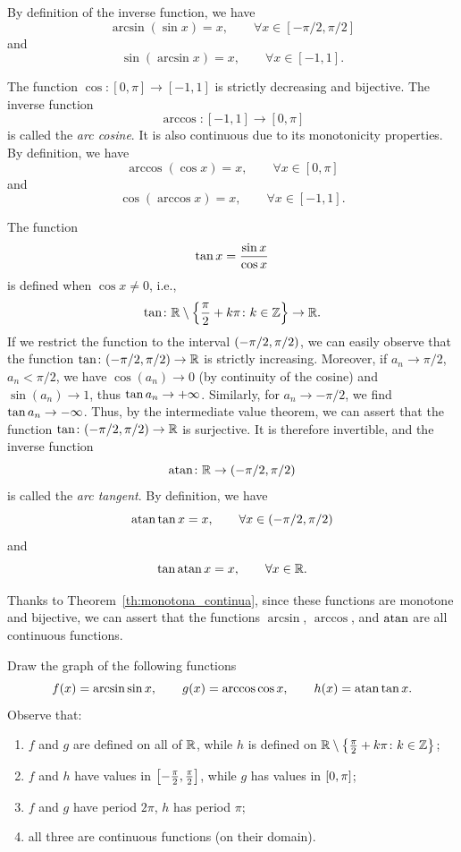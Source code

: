 By definition of the inverse function, we have
\[
  \arcsin(\sin x) = x, \qquad \forall x \in [-\pi/2, \pi/2]
\]
and
\[
  \sin(\arcsin x) = x, \qquad \forall x \in [-1, 1].
\]

The function $\cos \colon[0,\pi] \to [-1,1]$ is strictly decreasing and
bijective. The inverse function
\[
  \arccos\colon[-1,1] \to [0,\pi]
\]
is called the \emph{arc cosine}. It is also continuous due to its monotonicity
properties. By definition, we have
\[
  \arccos(\cos x) = x, \qquad \forall x \in [0,\pi]
\]
and
\[
    \cos(\arccos x) = x, \qquad \forall x \in [-1,1].
\]

The function
%
\[
\operatorname{tan} x = \frac{\sin x}{\cos x}
\]
is defined when $\cos x\neq 0$, i.e.,
\[
  \operatorname{tan} \colon {\mathbb R} \setminus{\left\{ \frac \pi 2+ k\pi\colon k\in {\mathbb Z}\right\}} \to {\mathbb R}.
\]
If we restrict the function to the interval ${\left( -\pi/2, \pi/2 \right)}$, we can
easily observe that the function $\operatorname{tan}\colon(-\pi/2,\pi/2)\to {\mathbb R}$ is strictly
increasing. Moreover, if $a_n \to \pi/2$, $a_n<\pi/2$, we have $\cos(a_n)\to 0$
(by continuity of the cosine) and $\sin(a_n)\to 1$, thus $\operatorname{tan} a_n\to +\infty$.
Similarly, for $a_n \to -\pi/2$, we find $\operatorname{tan} a_n \to -\infty$. Thus, by the
intermediate value theorem, we can assert that the function
$\operatorname{tan}\colon(-\pi/2,\pi/2)\to {\mathbb R}$ is surjective. It is therefore invertible, and
the inverse function
\[
  \operatorname{atan} \colon {\mathbb R} \to (-\pi/2,\pi/2)
\]
is called the \emph{arc tangent}. By definition, we have
\[
  \operatorname{atan} \operatorname{tan} x = x, \qquad \forall x \in (-\pi/2, \pi/2)
\]
and
\[
  \operatorname{tan}\operatorname{atan} x = x, \qquad \forall x \in {\mathbb R}.
\]

Thanks to Theorem~\ref{th:monotona_continua}, since these functions are monotone
and bijective, we can assert that the functions $\arcsin$, $\arccos$, and
$\operatorname{atan}$ are all continuous functions.

\begin{exercise}
  Draw the graph of the following functions
  \[
    f(x) = \arcsin \sin x, \qquad 
    g(x) = \arccos \cos x, \qquad 
    h(x) = \operatorname{atan} \operatorname{tan} x.
  \]
  Observe that:
  \begin{enumerate} 
    \item $f$ and $g$ are defined on all of ${\mathbb R}$, while $h$ is defined on ${\mathbb R}\setminus{\left\{ \frac{\pi}2+k\pi\colon k\in {\mathbb Z}\right\}}$;
    \item $f$ and $h$ have values in $\left[-\frac \pi 2,\frac \pi 2\right]$, while $g$ has values in $\left[0,\pi\right]$;
    \item $f$ and $g$ have period $2\pi$, $h$ has period $\pi$;
    \item all three are continuous functions (on their domain).
  \end{enumerate}
\end{exercise}

